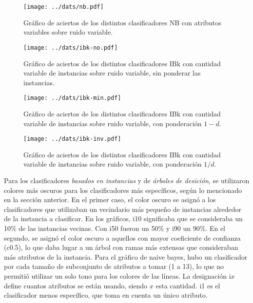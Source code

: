 \documentclass[a4paper,10pt]{article}
\begin{document}
\begin{figure}[h]
\centering
\texttt{[image: ../dats/nb.pdf]}
\caption{Gráfico de aciertos de los distintos clasificadores \textsf{NB} con atributos variables sobre ruido variable.}\label{fig:nb}
\end{figure}

\begin{figure}[h]
\centering
\texttt{[image: ../dats/ibk-no.pdf]}
\caption{Gráfico de aciertos de los distintos clasificadores \textsf{IBk} con cantidad variable de instancias sobre ruido variable, sin ponderar las instancias.}\label{fig:ibk-no}
\end{figure}

\begin{figure}[h]
\centering
\texttt{[image: ../dats/ibk-min.pdf]}
\caption{Gráfico de aciertos de los distintos clasificadores \textsf{IBk} con cantidad variable de instancias sobre ruido variable, con ponderación $1-d$.}\label{fig:ibk-min}
\end{figure}

\begin{figure}[h]
\centering
\texttt{[image: ../dats/ibk-inv.pdf]}
\caption{Gráfico de aciertos de los distintos clasificadores \textsf{IBk} con cantidad variable de instancias sobre ruido variable, con ponderación $1/d$.}\label{fig:ibk-inv}
\end{figure}


Para los clasificadores \emph{basados en instancias} y de \emph{árboles de desición}, se utilizaron colores más oscuros para los clasificadores más específicos, según lo mencionado en la sección anterior. En el primer caso, el color oscuro se asignó a los clasificadores que utilizaban un vecindario más pequeño de instancias alrededor de la instancia a clasificar. En los gráficos, \textsf{i10} significaba que se consideraba un 10\% de las instancias vecinas. Con \textsf{i50} fueron un 50\% y \textsf{i90} un 90\%. En el segundo, se asignó el color oscuro a aquellos con mayor coeficiente de confianza (\textsf{c0.5}), lo que daba lugar a un árbol con ramas más extensas que consideraban más atributos de la instancia. Para el gráfico de \textsf{naive bayes}, hubo un clasificador por cada tamaño de subconjunto de atributos a tomar (1 a 13), lo que no permitió utilizar un solo tono para los colores de las líneas. La designación i$x$ define cuantos atributos se están usando, siendo $x$ esta cantidad. \textsf{i1} es el clasificador menos específico, que toma en cuenta un único atributo.
\end{document}
